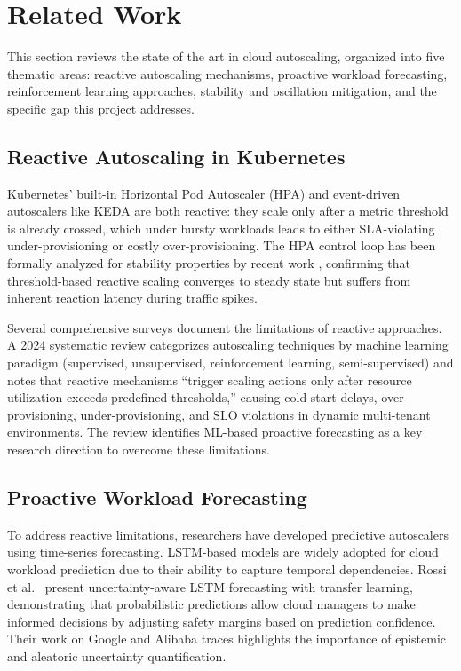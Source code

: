 \section{Related Work}
\label{sec:rw}

This section reviews the state of the art in cloud autoscaling, organized into five thematic areas: reactive autoscaling mechanisms, proactive workload forecasting, reinforcement learning approaches, stability and oscillation mitigation, and the specific gap this project addresses.

\subsection{Reactive Autoscaling in Kubernetes}

Kubernetes' built-in Horizontal Pod Autoscaler (HPA) and event-driven autoscalers like KEDA are both reactive: they scale only after a metric threshold is already crossed, which under bursty workloads leads to either SLA-violating under-provisioning or costly over-provisioning. The HPA control loop has been formally analyzed for stability properties by recent work \cite{HpaStability25}, confirming that threshold-based reactive scaling converges to steady state but suffers from inherent reaction latency during traffic spikes.

Several comprehensive surveys document the limitations of reactive approaches. A 2024 systematic review \cite{AutoScalingSurvey24} categorizes autoscaling techniques by machine learning paradigm (supervised, unsupervised, reinforcement learning, semi-supervised) and notes that reactive mechanisms ``trigger scaling actions only after resource utilization exceeds predefined thresholds,'' causing cold-start delays, over-provisioning, under-provisioning, and SLO violations in dynamic multi-tenant environments. The review identifies ML-based proactive forecasting as a key research direction to overcome these limitations.

\subsection{Proactive Workload Forecasting}

To address reactive limitations, researchers have developed predictive autoscalers using time-series forecasting. LSTM-based models are widely adopted for cloud workload prediction due to their ability to capture temporal dependencies. Rossi et al.~\cite{RossiUncertaintyAware24} present uncertainty-aware LSTM forecasting with transfer learning, demonstrating that probabilistic predictions allow cloud managers to make informed decisions by adjusting safety margins based on prediction confidence. Their work on Google and Alibaba traces highlights the importance of epistemic and aleatoric uncertainty quantification.

